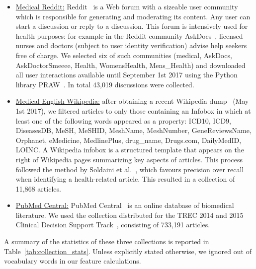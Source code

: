 \begin{itemize}[leftmargin=*]
    \item \underline{Medical Reddit:} Reddit~\cite{reddit} is a Web forum with a sizeable user community which is responsible for generating and moderating its content. Any user can start a discussion or reply to a discussion. This forum is intensively used for health purposes: for example in the Reddit community AskDocs~\cite{redditaskdocs}, licensed nurses and doctors (subject to user identity verification) advise help seekers free of charge. We selected six of such communities
        (medical, AskDocs, AskDoctorSmeeee, Health, WomensHealth, Mens\_Health) and downloaded all user interactions available until September 1st 2017 using the Python library PRAW~\cite{redditapi}. In total 43,019 discussions were collected.

\item \underline{Medical English Wikipedia:} after obtaining a recent Wikipedia dump~\cite{wikipedia} (May 1st 2017), we filtered articles to only those containing an Infobox in which at least one of the following words appeared as a property: ICD10, ICD9, DiseasesDB, MeSH, MeSHID, MeshName, MeshNumber, GeneReviewsName, Orphanet, eMedicine, MedlinePlus, drug\_name, Drugs.com, DailyMedID, LOINC. A Wikipedia infobox is a structured template that appears on the right of Wikipedia pages summarizing key aspects of articles.
This process followed the method by Soldaini et al.~\cite{soldaini15}, which favours precision over recall when identifying a health-related article. This resulted in a collection of 11,868 articles. 

\item \underline{PubMed Central:} PubMed Central~\cite{pubmed} is an online  database of biomedical literature. We used the collection distributed for the TREC 2014 and 2015 Clinical Decision Support Track~\cite{roberts16,trec15}, consisting of 733,191 articles. 
 
\end{itemize}

A summary of the statistics of these three collections is reported in Table~\ref{tab:collection_stats}. 
Unless explicitly stated otherwise, we ignored out of vocabulary words in our feature calculations.

